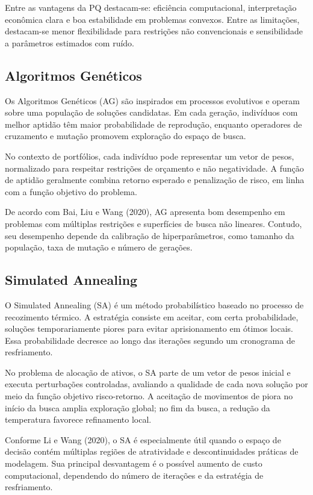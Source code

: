 \documentclass[
  12pt,
  oneside,
  a4paper,
  brazil
]{abntex2}
\begin{document}
Entre as vantagens da PQ destacam-se: eficiência computacional, interpretação econômica clara e boa estabilidade em problemas convexos. Entre as limitações, destacam-se menor flexibilidade para restrições não convencionais e sensibilidade a parâmetros estimados com ruído.

\subsection{Algoritmos Genéticos}
Os Algoritmos Genéticos (AG) são inspirados em processos evolutivos e operam sobre uma população de soluções candidatas. Em cada geração, indivíduos com melhor aptidão têm maior probabilidade de reprodução, enquanto operadores de cruzamento e mutação promovem exploração do espaço de busca.

No contexto de portfólios, cada indivíduo pode representar um vetor de pesos, normalizado para respeitar restrições de orçamento e não negatividade. A função de aptidão geralmente combina retorno esperado e penalização de risco, em linha com a função objetivo do problema.

De acordo com Bai, Liu e Wang (2020), AG apresenta bom desempenho em problemas com múltiplas restrições e superfícies de busca não lineares. Contudo, seu desempenho depende da calibração de hiperparâmetros, como tamanho da população, taxa de mutação e número de gerações.

\subsection{Simulated Annealing}
O Simulated Annealing (SA) é um método probabilístico baseado no processo de recozimento térmico. A estratégia consiste em aceitar, com certa probabilidade, soluções temporariamente piores para evitar aprisionamento em ótimos locais. Essa probabilidade decresce ao longo das iterações segundo um cronograma de resfriamento.

No problema de alocação de ativos, o SA parte de um vetor de pesos inicial e executa perturbações controladas, avaliando a qualidade de cada nova solução por meio da função objetivo risco-retorno. A aceitação de movimentos de piora no início da busca amplia exploração global; no fim da busca, a redução da temperatura favorece refinamento local.

Conforme Li e Wang (2020), o SA é especialmente útil quando o espaço de decisão contém múltiplas regiões de atratividade e descontinuidades práticas de modelagem. Sua principal desvantagem é o possível aumento de custo computacional, dependendo do número de iterações e da estratégia de resfriamento.
\end{document}
